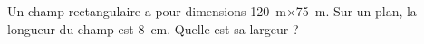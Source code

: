 
\begin{exercice}\label{exo2smath-0128}

    Un champ rectangulaire a pour dimensions \SI{120}{\meter}\( \times\)\SI{75}{\meter}. Sur un plan, la longueur du champ est \SI{8}{\centi\meter}. Quelle est sa largeur ?

\end{exercice}
